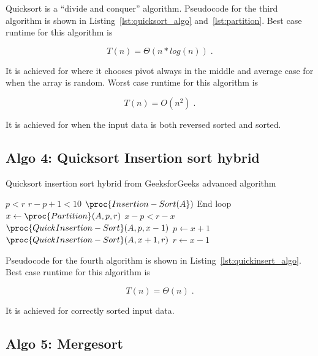 \documentclass[twocolumn, sigconf, nonacm, natbib, screen, balance=False]{acmart}
\begin{document}
Quicksort is a “divide and conquer” algorithm.
Pseudocode for the third algorithm is shown in
Listing~\ref{lst:quicksort_algo} and~\ref{lst:partition}. Best case runtime for this algorithm is

\begin{equation}
  T(n) = \Theta(n*log(n)) \;.  \label{eq:quick_sort_best}
\end{equation}

It is achieved for where it chooses pivot always in the middle and average case for when the array is random. Worst case runtime for this algorithm is

\begin{equation}
  T(n) = O(n^2) \;.  \label{eq:quick_sort_worst}
\end{equation}

It is achieved for when the input data is both reversed sorted and sorted.

\subsection{Algo 4: Quicksort Insertion sort hybrid}\label{sec:algo5}

\begin{listing}
  \caption{Quicksort insertion sort hybrid from GeeksforGeeks advanced algorithm}
  \label{lst:quickinsert_algo}
  \begin{codebox}
    \li \While $p<r$
    \li	\Do \If $r-p+1<10$
    \li		\Do $\proc{Insertion-Sort(A})$
    \li			End loop
    \li 	\Else
    \li			$x \gets \proc{Partition}(A, p, r)$
    \li 	\If $x-p<r-x$
    \li		\Do $\proc{QuickInsertion-Sort}(A, p, x-1)$
    \li 	$p \gets x+1$
    \li 	\Else
    \li 	$\proc{QuickInsertion-Sort}(A, x+1, r)$
    \li 	$r \gets x-1$
    \End
    \End
    \End
  \end{codebox}
\end{listing}

Pseudocode for the fourth algorithm is shown in
Listing~\ref{lst:quickinsert_algo}. Best case runtime for this algorithm
is

\begin{equation}
  T(n) = \Theta(n) \;.  \label{eq:quick_sort_best}
\end{equation}

It is achieved for correctly sorted input data.

\subsection{Algo 5: Mergesort}\label{sec:algo6}
\end{document}
